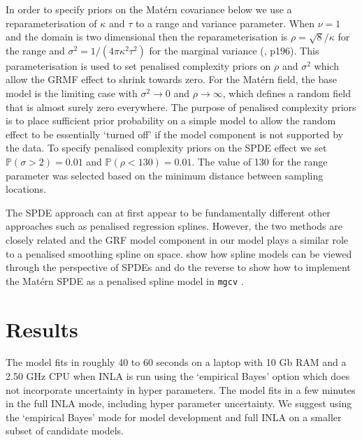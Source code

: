 \documentclass{stylefile16/statsoc}
\begin{document}
In order to specify priors on the Mat\'ern covariance below we use a reparameterisation of $\kappa$ and $\tau$ to a range and variance parameter.  When $\nu = 1$ and the domain is two dimensional then the reparameterisation is $\rho = \sqrt{8} / \kappa$ for the range and $\sigma^2 = 1 / (4\pi\kappa^2\tau^2)$ for the marginal variance (\cite{blangiardo_spatial_2013}, p196).  This parameterisation is used to set penalised complexity priors \citep{simpson_penalising_2017} on $\rho$ and $\sigma^2$ which allow the GRMF effect to shrink towards zero.  For the Mat\'ern field, the base model is the limiting case with $\sigma^2 \rightarrow 0$ and $\rho \rightarrow \infty$, which defines a random field that is almost surely zero everywhere.  The purpose of penalised complexity priors is to place sufficient prior probability on a simple model to allow the random effect to be essentially `turned off' if the model component is not supported by the data.  To specify penalised complexity priors on the SPDE effect we set $\mathbb{P}(\sigma > 2) = 0.01$ and $\mathbb{P}(\rho < 130) = 0.01$.  The value of 130 for the range parameter was selected based on the minimum distance between sampling locations.  

The SPDE approach can at first appear to be fundamentally different  other approaches such as penalised regression splines.  However, the two methods are closely related and the GRF model component in our model plays a similar role to a penalised smoothing spline on space.  \cite{yue_bayesian_2014} show how spline models can be viewed through the perspective of SPDEs and \cite{ miller_understanding_2019} do the reverse to show how to implement the Mat\'ern SPDE as a penalised spline model in \texttt{mgcv} \citep{wood_gam_2017}.

\section{Results}
\label{sec-results} 

The model fits in roughly 40 to 60 seconds on a laptop with 10 Gb RAM and a 2.50 GHz CPU when INLA is run using the `empirical Bayes' option which does not incorporate uncertainty in hyper parameters.  The model fits in a few minutes in the full INLA mode, including hyper parameter uncertainty.  We suggest using the `empirical Bayes' mode for model development and full INLA on a smaller subset of candidate models.  
\end{document}
